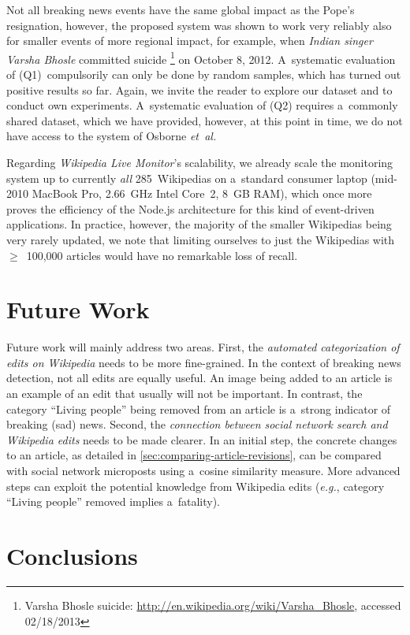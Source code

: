 Not all breaking news events have the same global impact as the Pope's resignation,
however, the proposed system was shown to work very reliably
also for smaller events of more regional impact, for example,
when \emph{Indian singer Varsha Bhosle} committed suicide%
\footnote{Varsha Bhosle suicide: \url{http://en.wikipedia.org/wiki/Varsha_Bhosle},
accessed 02/18/2013} on October 8, 2012.
A~systematic evaluation of (Q1)~compulsorily can only be done by random samples,
which has turned out positive results so far.
Again, we invite the reader to explore our dataset and to conduct own experiments.
A~systematic evaluation of (Q2) requires a~commonly shared dataset,
which we have provided, however, at this point in time, we do not have access to the system
of Osborne \emph{et~al.}

Regarding \emph{Wikipedia Live Monitor}'s scalability,
we already scale the monitoring system
up to currently \emph{all} 285~Wikipedias on a~standard consumer laptop
(mid-2010 MacBook Pro, 2.66~GHz Intel Core~2, 8~GB RAM),
which once more proves the efficiency of the Node.js architecture
for this kind of event-driven applications.
In practice, however, the majority of the smaller Wikipedias
being very rarely updated,
we note that limiting ourselves to just the Wikipedias
with $\geq$~100,000 articles would have no remarkable loss of recall.

\section{Future Work}

Future work will mainly address two areas.
First, the \emph{automated categorization of edits on Wikipedia}
needs to be more fine-grained.
In the context of breaking news detection, not all edits are equally useful.
An image being added to an article is an example of an edit
that usually will not be important.
In contrast, the category ``Living people'' being removed from an article
is a~strong indicator of breaking (sad) news.
Second, the \emph{connection between social network search and Wikipedia edits}
needs to be made clearer. 
In an initial step, the concrete changes to an article, as detailed in
\autoref{sec:comparing-article-revisions}, can be compared with
social network microposts using a~cosine similarity measure.
More advanced steps can exploit the potential knowledge from Wikipedia edits
(\emph{e.g.}, category ``Living people'' removed implies a~fatality).

\section{Conclusions}

